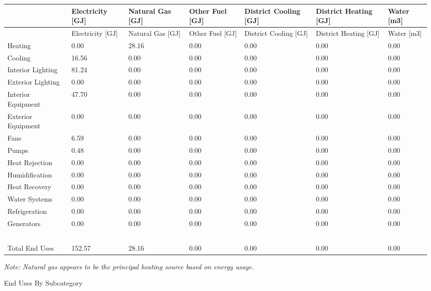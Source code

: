 {\scriptsize
\begin{longtable}[c]{>{\raggedright}p{0.85in}>{\raggedright}p{0.85in}>{\raggedright}p{0.85in}>{\raggedright}p{0.85in}p{0.85in}p{0.85in}p{0.85in}}
\toprule 
~ & Electricity [GJ] & Natural Gas [GJ] & Other Fuel [GJ] & District Cooling [GJ] & District Heating [GJ] & Water [m3] \tabularnewline
\midrule
\endfirsthead

\toprule 
~ & Electricity [GJ] & Natural Gas [GJ] & Other Fuel [GJ] & District Cooling [GJ] & District Heating [GJ] & Water [m3] \tabularnewline
\midrule
\endhead

Heating & 0.00 & 28.16 & 0.00 & 0.00 & 0.00 & 0.00 \tabularnewline
Cooling & 16.56 & 0.00 & 0.00 & 0.00 & 0.00 & 0.00 \tabularnewline
Interior Lighting & 81.24 & 0.00 & 0.00 & 0.00 & 0.00 & 0.00 \tabularnewline
Exterior Lighting & 0.00 & 0.00 & 0.00 & 0.00 & 0.00 & 0.00 \tabularnewline
Interior Equipment & 47.70 & 0.00 & 0.00 & 0.00 & 0.00 & 0.00 \tabularnewline
Exterior Equipment & 0.00 & 0.00 & 0.00 & 0.00 & 0.00 & 0.00 \tabularnewline
Fans & 6.59 & 0.00 & 0.00 & 0.00 & 0.00 & 0.00 \tabularnewline
Pumps & 0.48 & 0.00 & 0.00 & 0.00 & 0.00 & 0.00 \tabularnewline
Heat Rejection & 0.00 & 0.00 & 0.00 & 0.00 & 0.00 & 0.00 \tabularnewline
Humidification & 0.00 & 0.00 & 0.00 & 0.00 & 0.00 & 0.00 \tabularnewline
Heat Recovery & 0.00 & 0.00 & 0.00 & 0.00 & 0.00 & 0.00 \tabularnewline
Water Systems & 0.00 & 0.00 & 0.00 & 0.00 & 0.00 & 0.00 \tabularnewline
Refrigeration & 0.00 & 0.00 & 0.00 & 0.00 & 0.00 & 0.00 \tabularnewline
Generators & 0.00 & 0.00 & 0.00 & 0.00 & 0.00 & 0.00 \tabularnewline
~ & ~ & ~ & ~ & ~ & ~ & ~ \tabularnewline
Total End Uses & 152.57 & 28.16 & 0.00 & 0.00 & 0.00 & 0.00 \tabularnewline
\bottomrule
\end{longtable}}

\emph{Note: Natural gas appears to be the principal heating source based on energy usage.}

End Uses By Subcategory

